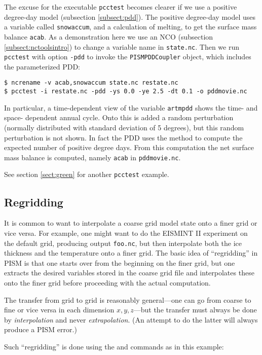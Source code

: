 The excuse for the executable \verb|pcctest| becomes clearer if we use a positive degree-day
model (subsection \ref{subsect:pdd}).  The positive degree-day
model uses a variable called \verb|snowaccum|, and a calculation of melting, to get the
surface mass balance \verb|acab|.  As a demonstration here we use an NCO (subsection 
\ref{subsect:nctoolsintro}) to change a variable name in \verb|state.nc|.  Then we run \verb|pcctest|
with option \verb|-pdd| to invoke the \verb|PISMPDDCoupler|
object, which includes the parameterized PDD:
\begin{verbatim}
$ ncrename -v acab,snowaccum state.nc restate.nc
$ pcctest -i restate.nc -pdd -ys 0.0 -ye 2.5 -dt 0.1 -o pddmovie.nc
\end{verbatim}
In particular, a time-dependent view of the variable \verb|artmpdd| shows the time- and space-
dependent annual cycle.  Onto this is added a random perturbation (normally distributed with standard 
deviation of 5 degrees), but this random perturbation is not shown.  In fact the PDD uses the
\cite{CalovGreve05} method to compute the expected number of positive degree days.  From this
computation the net surface mass balance is computed, namely \verb|acab| in \verb|pddmovie.nc|.

See section \ref{sect:green} for another \verb|pcctest| example.

\subsection{Regridding}  It is common to want to interpolate a coarse grid model state onto a finer grid or vice versa.  For example, one might want to do the EISMINT II experiment on the default grid, producing output \verb|foo.nc|, but then interpolate both the ice thickness and the temperature onto a finer grid.  The basic idea of ``regridding'' in PISM is that one starts over from the beginning on the finer grid, but one extracts the desired variables stored in the coarse grid file and interpolates these onto the finer grid before proceeding with the actual computation.

The transfer from grid to grid is reasonably general---one can go from coarse to fine or vice versa in each dimension $x,y,z$---but the transfer must always be done by \emph{interpolation} and never \emph{extrapolation}.  (An attempt to do the latter will always produce a PISM error.)

Such ``regridding'' is done using the  and  commands as in this example:

